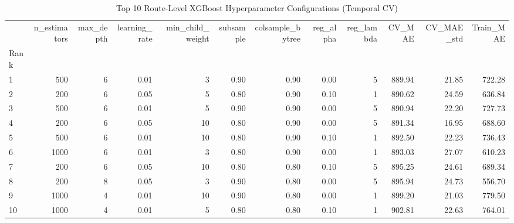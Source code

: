 \begin{table}
\caption{Top 10 Route-Level XGBoost Hyperparameter Configurations (Temporal CV)}
\label{tab:top10_hyperparams}
\begin{tabular}{lrrrrrrrrrrr}
\toprule
 & n_estimators & max_depth & learning_rate & min_child_weight & subsample & colsample_bytree & reg_alpha & reg_lambda & CV_MAE & CV_MAE_std & Train_MAE \\
Rank &  &  &  &  &  &  &  &  &  &  &  \\
\midrule
1 & 500 & 6 & 0.01 & 3 & 0.90 & 0.90 & 0.00 & 5 & 889.94 & 21.85 & 722.28 \\
2 & 200 & 6 & 0.05 & 5 & 0.80 & 0.90 & 0.10 & 1 & 890.62 & 24.59 & 636.84 \\
3 & 500 & 6 & 0.01 & 5 & 0.90 & 0.90 & 0.00 & 5 & 890.94 & 22.20 & 727.73 \\
4 & 200 & 6 & 0.05 & 10 & 0.80 & 0.90 & 0.00 & 5 & 891.34 & 16.95 & 688.60 \\
5 & 500 & 6 & 0.01 & 10 & 0.80 & 0.90 & 0.10 & 1 & 892.50 & 22.23 & 736.43 \\
6 & 1000 & 6 & 0.01 & 3 & 0.80 & 0.90 & 0.00 & 1 & 893.03 & 27.07 & 610.23 \\
7 & 200 & 6 & 0.05 & 10 & 0.80 & 0.80 & 0.10 & 5 & 895.25 & 24.61 & 689.34 \\
8 & 200 & 8 & 0.05 & 3 & 0.90 & 0.80 & 0.00 & 5 & 895.94 & 24.73 & 556.70 \\
9 & 1000 & 4 & 0.01 & 10 & 0.90 & 0.80 & 0.00 & 1 & 899.20 & 21.03 & 779.50 \\
10 & 1000 & 4 & 0.01 & 5 & 0.80 & 0.80 & 0.10 & 1 & 902.81 & 22.63 & 764.01 \\
\bottomrule
\end{tabular}
\end{table}
